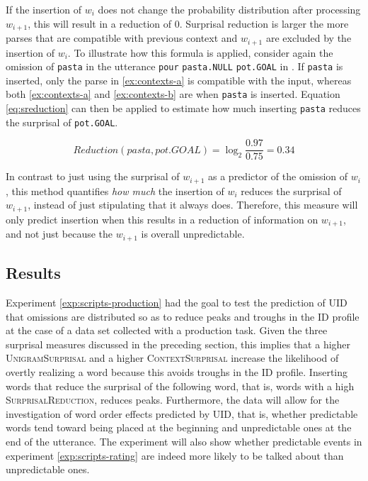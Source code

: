 If the insertion of $w_i$ does not change the probability distribution after processing $w_{i+1}$, this will result in a reduction of 0. Surprisal reduction is larger the more parses that are compatible with previous context and $w_{i+1}$ are excluded by the insertion of $w_i$. To illustrate how this formula is applied, consider again the omission of \texttt{pasta} in the utterance \texttt{pour} \texttt{pasta.NULL} \texttt{pot.GOAL} in \LLast. If \texttt{pasta} is inserted, only the parse in \ref{ex:contexts-a} is compatible with the input, whereas both \ref{ex:contexts-a} and \ref{ex:contexts-b} are when \texttt{pasta} is inserted. Equation \ref{eq:sreduction} can then be applied to estimate how much inserting \texttt{pasta} reduces the surprisal of \texttt{pot.GOAL}.

\begin{equation} 
 \displaystyle Reduction(pasta, pot.GOAL) = \log_2 \frac{0.97}{0.75} = 0.34
\end{equation}

In contrast to just using the surprisal of $w_{i+1}$ as a predictor of the omission of $w_i$, this method quantifies \textit{how much} the insertion of $w_i$ reduces the surprisal of $w_{i+1}$,  instead of just stipulating that it always does. Therefore, this measure will only predict insertion when this results in a reduction of information on $w_{i+1}$, and not just because the $w_{i+1}$ is overall unpredictable. 

\subsection{Results}
\label{sec:scripts-production-results}

Experiment \ref{exp:scripts-production} had the goal to test the prediction of UID that omissions are distributed so as to reduce peaks and troughs in the ID profile at the case of a data set collected with a production task. Given the three surprisal measures discussed in the preceding section, this implies that a higher \textsc{UnigramSurprisal} and a higher \textsc{ContextSurprisal} increase the likelihood of overtly realizing a word because this avoids troughs in the ID profile. Inserting words that reduce the surprisal of the following word, that is, words with a high \textsc{SurprisalReduction}, reduces peaks. Furthermore, the data will allow for the investigation of word order effects predicted by UID, that is, whether predictable words tend toward being placed at the beginning and unpredictable ones at the end of the utterance. The experiment will also show whether predictable events in experiment \ref{exp:scripts-rating} are indeed more likely to be talked about than unpredictable ones.


